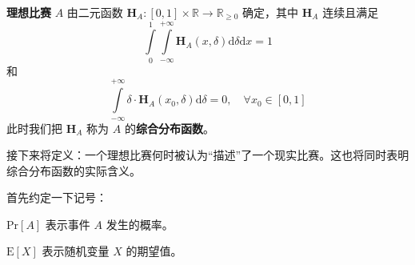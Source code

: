             \begin{definition}[理想比赛]
                \textbf{理想比赛} $A$ 由二元函数 $\bm{H}_A:\left[0,1\right]\times\mathbb{R}\to\mathbb{R}_{\geq 0}$ 确定，其中 $\bm{H}_A$ 连续且满足
                \begin{equation}
                    \int\limits_0^1\int\limits_{-\infty}^{+\infty} \bm{H}_A(x,\delta)\mathrm{d}\delta\mathrm{d}x=1
                    \label{formula:totalEqual1}
                \end{equation}
                和
                \begin{equation}
                    \int\limits_{-\infty}^{+\infty} \delta\cdot\bm{H}_A(x_0,\delta)\mathrm{d}\delta=0,\quad\forall x_0\in\left[0,1\right]
                    \label{formula:expectationEqual0}
                \end{equation}
                此时我们把 $\bm{H}_A$ 称为 $A$ 的\textbf{综合分布函数}。
                \label{def:idealContest}
            \end{definition}

            接下来将定义：一个理想比赛何时被认为“描述”了一个现实比赛。这也将同时表明综合分布函数的实际含义。
            
            \vspace{1.5ex}

            首先约定一下记号：

            \begin{asparaitem}
                \item $\mathrm{Pr}\left[A\right]$ 表示事件 $A$ 发生的概率。
                \item $\mathrm{E}\left[X\right]$ 表示随机变量 $X$ 的期望值。
            \end{asparaitem}

